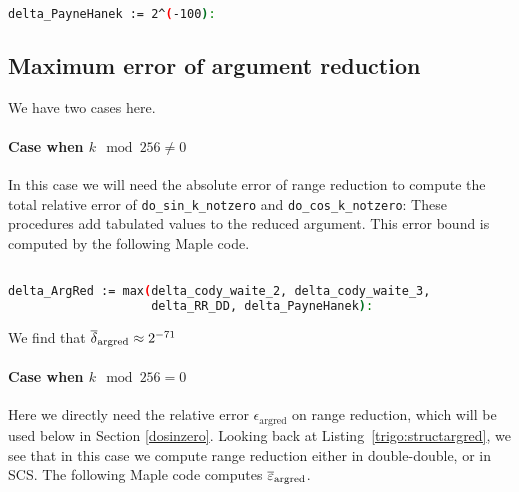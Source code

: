 \begin{lstlisting}[caption={Payne and Hanek error},
  language={sh}, numbers=none]% of course it's maple
%Skip a line here, I don't know why, otherwise latex eats the first line

delta_PayneHanek := 2^(-100):
\end{lstlisting}


\subsection{Maximum error of argument reduction }

We have two cases here.

\paragraph*{Case when $k\mod 256\ne 0$}

In this case we will need the absolute error of range reduction to compute the
total relative error of \verb!do_sin_k_notzero! and
\verb!do_cos_k_notzero!: These procedures add tabulated values to the
reduced argument. This error bound is computed by the following Maple code.

\begin{lstlisting}[caption={Maple script computing the absolute error bound of range reduction}, firstnumber=1,
  language={sh}, numbers=none]% of course it's maple
%Skip a line here, I don't know why, otherwise latex eats the first line

delta_ArgRed := max(delta_cody_waite_2, delta_cody_waite_3,
                    delta_RR_DD, delta_PayneHanek):
\end{lstlisting}

We find that ${\overline{\delta}}_{\mathrm{argred}}\approx 2^{-71}$


\paragraph*{Case when $k\mod 256= 0$}

Here we directly need the relative error $\epsilon_{\mathrm{argred}}$
on range reduction, which will be used below in Section
\ref{dosinzero}. Looking back at Listing~\ref{trigo:structargred}, we
see that in this case we compute range reduction either in
double-double, or in SCS. The following Maple code computes
${\overline{\varepsilon}}_{\mathrm{argred}}$.

